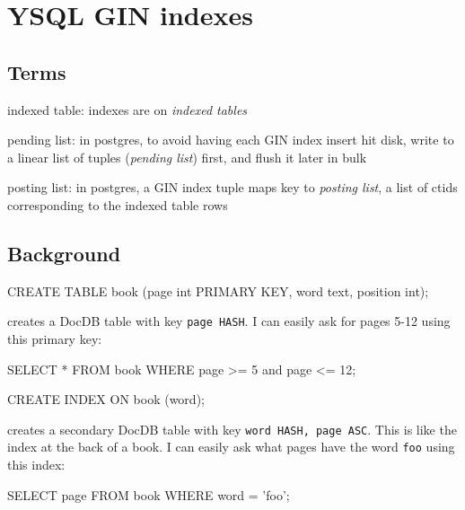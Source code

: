 \documentclass[11pt]{article}
\begin{document}
\hypertarget{ysql-gin-indexes}{%
\section{YSQL GIN indexes}\label{ysql-gin-indexes}}

\hypertarget{terms}{%
\subsection{Terms}\label{terms}}

\begin{oparts}
\item
  indexed table: indexes are on \emph{indexed tables}
\item
  pending list: in postgres, to avoid having each GIN index insert hit
  disk, write to a linear list of tuples (\emph{pending list}) first,
  and flush it later in bulk
\item
  posting list: in postgres, a GIN index tuple maps key to \emph{posting
  list}, a list of ctids corresponding to the indexed table rows
\end{oparts}

\hypertarget{background}{%
\subsection{Background}\label{background}}

\begin{sqlcode}
CREATE TABLE book (page int PRIMARY KEY, word text, position int);
\end{sqlcode}

creates a DocDB table with key \texttt{page\ HASH}. I can easily ask for
pages 5-12 using this primary key:

\begin{sqlcode}
SELECT * FROM book WHERE page >= 5 and page <= 12;
\end{sqlcode}

\begin{sqlcode}
CREATE INDEX ON book (word);
\end{sqlcode}

creates a secondary DocDB table with key
\texttt{word\ HASH,\ page\ ASC}. This is like the index at the back of a
book. I can easily ask what pages have the word \texttt{foo} using this
index:

\begin{sqlcode}
SELECT page FROM book WHERE word = 'foo';
\end{sqlcode}
\end{document}
